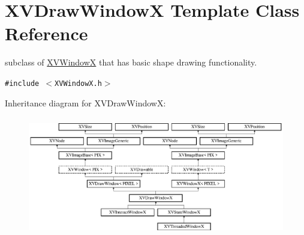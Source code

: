 \hypertarget{class_XVDrawWindowX}{
\section{XVDraw\-Window\-X  Template Class Reference}
\label{XVDrawWindowX}
}
subclass of \hyperlink{class_XVWindowX}{XVWindow\-X} that has basic shape drawing functionality. 


{\tt \#include $<$XVWindow\-X.h$>$}

Inheritance diagram for XVDraw\-Window\-X:\begin{figure}[H]
\begin{center}
\leavevmode
\includegraphics[height=5.23977cm]{class_XVDrawWindowX}
\end{center}
\end{figure}

